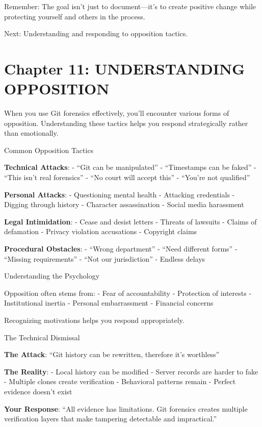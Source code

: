 Remember: The goal isn't just to document---it's to create positive
change while protecting yourself and others in the process.

Next: Understanding and responding to opposition tactics.

\section{Chapter 11: UNDERSTANDING
OPPOSITION}\label{chapter-11-understanding-opposition}

When you use Git forensics effectively, you'll encounter various forms
of opposition. Understanding these tactics helps you respond
strategically rather than emotionally.

Common Opposition Tactics

\textbf{Technical Attacks}: - ``Git can be manipulated'' - ``Timestamps
can be faked'' - ``This isn't real forensics'' - ``No court will accept
this'' - ``You're not qualified''

\textbf{Personal Attacks}: - Questioning mental health - Attacking
credentials - Digging through history - Character assassination - Social
media harassment

\textbf{Legal Intimidation}: - Cease and desist letters - Threats of
lawsuits - Claims of defamation - Privacy violation accusations -
Copyright claims

\textbf{Procedural Obstacles}: - ``Wrong department'' - ``Need different
forms'' - ``Missing requirements'' - ``Not our jurisdiction'' - Endless
delays

Understanding the Psychology

Opposition often stems from: - Fear of accountability - Protection of
interests - Institutional inertia - Personal embarrassment - Financial
concerns

Recognizing motivations helps you respond appropriately.

The Technical Dismissal

\textbf{The Attack}: ``Git history can be rewritten, therefore it's
worthless''

\textbf{The Reality}: - Local history can be modified - Server records
are harder to fake - Multiple clones create verification - Behavioral
patterns remain - Perfect evidence doesn't exist

\textbf{Your Response}: ``All evidence has limitations. Git forensics
creates multiple verification layers that make tampering detectable and
impractical.''

